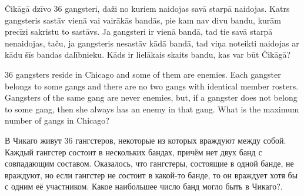 \begin{problem}
Čikāgā dzīvo $36$ gangsteri, daži no kuriem naidojas savā starpā naidojas. Katrs gangsteris sastāv vienā vai vairākās bandās, pie kam nav divu bandu, kurām precīzi sakristu to sastāvs. Ja gangsteri ir vienā bandā, tad tie savā starpā nenaidojas, taču, ja gangsteris nesastāv kādā bandā, tad viņa noteikti naidojas ar kādu šīs bandas dalībnieku.
Kāds ir lielākais skaits bandu, kas var būt Čikāgā? 

$36$ gangsters reside in Chicago and some of them are enemies. Each gangster belongs to some gangs and there are no two gangs with identical member rosters. Gangsters of the same gang are never enemies, but, if a gangster does not belong to some gang, then she always has an enemy in that gang. What is the maximum number of gangs in Chicago?


В Чикаго живут 36 гангстеров, некоторые из которых враждуют между собой. Каждый гангстер состоит в нескольких бандах, причём нет двух банд с совпадающим составом. Оказалось, что гангстеры, состоящие в одной банде, не враждуют, но если гангстер не состоит в какой-то банде, то он враждует хотя бы с одним её участником. Какое наибольшее число банд могло быть в Чикаго?.

\end{problem}



